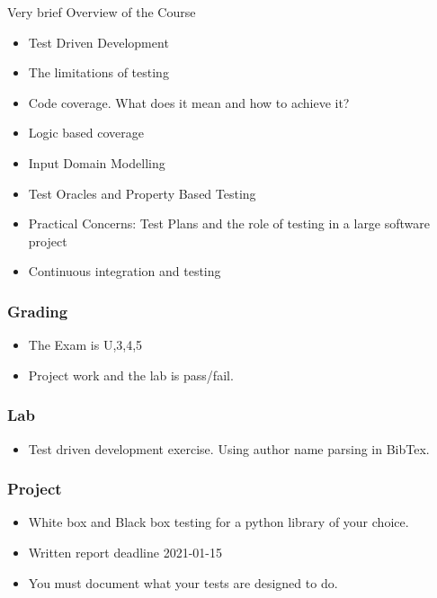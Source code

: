 \documentclass{beamer}
\begin{document}
\begin{frame}{Very brief Overview of the Course}
  \begin{itemize}
  \item Test Driven Development
  \item The limitations of testing
  \item Code coverage. What does it mean and how to achieve it?
  \item Logic based coverage
  \item Input Domain Modelling
  \item Test Oracles and Property Based Testing
  \item Practical Concerns: Test Plans and the role of testing in a
    large software project
  \item Continuous integration and testing 
  \end{itemize}
\end{frame}
\begin{frame}
  \frametitle{Grading}
  \begin{itemize}
  \item The Exam is U,3,4,5
  \item Project work and the lab is pass/fail.
  \end{itemize}
\end{frame}
\begin{frame}
  \frametitle{Lab}
  \begin{itemize}
  \item Test driven development exercise. Using author name parsing in
    BibTex. 
  \end{itemize}
\end{frame}
\begin{frame}
  \frametitle{Project}
  \begin{itemize}
  \item White box and Black box testing for a python library of your choice.
  \item Written report deadline 2021-01-15
  \item You must document what your tests are designed to do.
  \end{itemize}
\end{frame}
\end{document}
